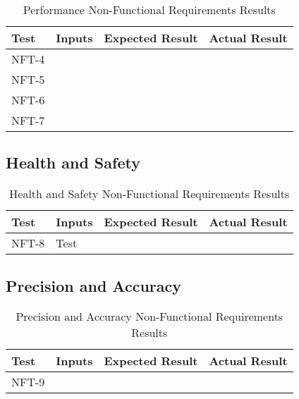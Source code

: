 \documentclass[12pt, titlepage]{article}
\begin{document}
\begin{table}[H]
  \centering
    \setlength{\leftmargini}{0cm}
    \begin{tabular}{| >{\centering\arraybackslash}m{1.5cm} | 
      >{\centering\arraybackslash}m{4cm} | 
      >{\centering\arraybackslash}m{4cm} | 
      >{\centering\arraybackslash}m{4cm} |}
    \hline
    \rowcolor[gray]{0.9}
    Test & Inputs & Expected Result & Actual Result\\
    \hline
    NFT-4 &  &  & \\
    \hline
    NFT-5 &  &  & \\
    \hline
    NFT-6 &  &  & \\
    \hline
    NFT-7 &  &  & \\
    \hline
    \end{tabular}
  \caption{Performance Non-Functional Requirements Results}
\end{table}

\subsection{Health and Safety}

\begin{table}[H]
  \centering
    \setlength{\leftmargini}{0cm}
    \begin{tabular}{| >{\centering\arraybackslash}m{1.5cm} | 
      >{\centering\arraybackslash}m{4cm} | 
      >{\centering\arraybackslash}m{4cm} | 
      >{\centering\arraybackslash}m{4cm} |}
    \hline
    \rowcolor[gray]{0.9}
    Test & Inputs & Expected Result & Actual Result\\
    \hline
    NFT-8 & Test &  & \\
    \hline
    \end{tabular}
  \caption{Health and Safety Non-Functional Requirements Results}
\end{table}

\subsection{Precision and Accuracy}

\begin{table}[H]
  \centering
    \setlength{\leftmargini}{0cm}
    \begin{tabular}{| >{\centering\arraybackslash}m{1.5cm} | 
      >{\centering\arraybackslash}m{4cm} | 
      >{\centering\arraybackslash}m{4cm} | 
      >{\centering\arraybackslash}m{4cm} |}
    \hline
    \rowcolor[gray]{0.9}
    Test & Inputs & Expected Result & Actual Result\\
    \hline
    NFT-9 &  &  & \\
    \hline
    \end{tabular}
  \caption{Precision and Accuracy Non-Functional Requirements Results}
\end{table}
\end{document}
